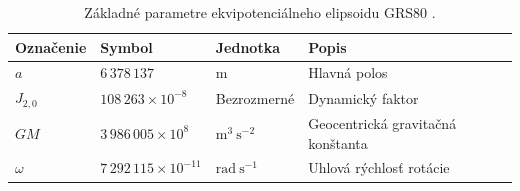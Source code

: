 \documentclass[a4paper, 12pt]{book}
\begin{document}
\begin{table}
\begin{center}
\caption{Základné parametre ekvipotenciálneho elipsoidu GRS80 
\parencite{GRS80}.}
\label{tab:grs80_fundamental}
\small
\begin{tabular}{l l l l}
\hline
Označenie & Symbol & Jednotka & Popis\\
\hline
$a$       & $6\,378\,137$ & m & Hlavná polos\\
$J_{2,0}$ & $108\,263 \times 10^{-8}$ & Bezrozmerné & Dynamický faktor\\
$GM$ & $3\,986\,005 \times 10^8$ & $\mathrm{m}^3 \ \mathrm{s}^{-2}$ 
& Geocentrická gravitačná konštanta\\
$\omega$ & $7\,292\,115 \times 10^{-11}$ & $\mathrm{rad} \ \mathrm{s}^{-1}$ 
& Uhlová rýchlosť rotácie\\
\hline
\end{tabular}
\end{center}
\end{table}
\end{document}
